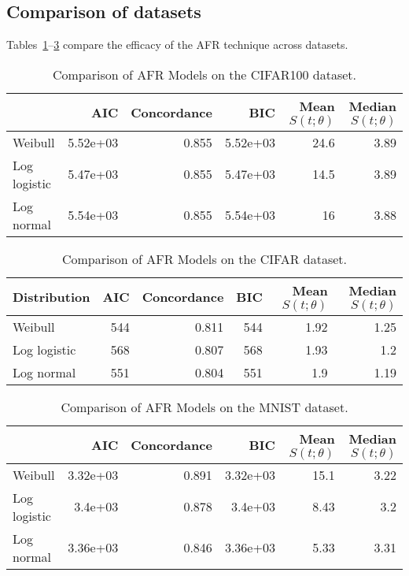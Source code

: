 \subsection{Comparison of datasets}
Tables~\ref{tab:cifar100}--\ref{tab:mnist} compare the efficacy of the AFR technique across datasets.

\begin{table}[!h]
\centering
\caption{Comparison of AFR Models on the CIFAR100 dataset.}
\label{tab:cifar100}
\begin{tabular}{lrrrrr}
\toprule
 & AIC & Concordance & BIC & Mean $S(t;\theta)$ & Median $S(t;\theta)$ \\
\midrule
Weibull & 5.52e+03 & 0.855 & 5.52e+03 & 24.6 & 3.89 \\
Log logistic & 5.47e+03 & 0.855 & 5.47e+03 & 14.5 & 3.89 \\
Log normal & 5.54e+03 & 0.855 & 5.54e+03 & 16 & 3.88 \\
\bottomrule
\end{tabular}
\centering
\end{table}


\begin{table}[!h]
\centering
\caption{Comparison of AFR Models on the CIFAR dataset.}
\label{tab:cifar}
\begin{tabular}{lrrrrr}
\toprule
Distribution &  AIC &  Concordance &  BIC &  Mean $S(t;\theta)$ &  Median $S(t;\theta)$ \\
\midrule
Weibull      &  544 &        0.811 &  544 &                1.92 &                  1.25 \\
Log logistic &  568 &        0.807 &  568 &                1.93 &                   1.2 \\
Log normal   &  551 &        0.804 &  551 &                 1.9 &                  1.19 \\
\bottomrule
\end{tabular}
\centering
\end{table}

\begin{table}[!h]
\centering
\caption{Comparison of AFR Models on the MNIST dataset.}
\label{tab:mnist}
\begin{tabular}{lrrrrr}
\toprule
{} &      AIC &  Concordance &      BIC &  Mean $S(t;\theta)$ &  Median $S(t;\theta)$ \\
\midrule
Weibull      & 3.32e+03 &        0.891 & 3.32e+03 &                15.1 &                  3.22 \\
Log logistic &  3.4e+03 &        0.878 &  3.4e+03 &                8.43 &                   3.2 \\
Log normal   & 3.36e+03 &        0.846 & 3.36e+03 &                5.33 &                  3.31 \\
\bottomrule
\end{tabular}
\end{table}

